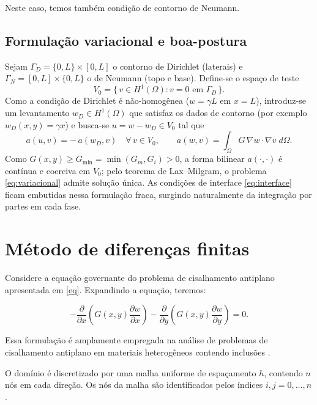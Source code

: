 \documentclass[brazil]{TCAM} %
\begin{document}
Neste caso, temos também condição de contorno de Neumann.

\subsection{Formulação variacional e boa-postura}

Sejam $\Gamma_D = \{0,L\}\times[0,L]$ o contorno de Dirichlet (laterais) e
$\Gamma_N = [0,L]\times\{0,L\}$ o de Neumann (topo e base). Define-se o espaço de
teste
\begin{equation*}
    V_0 = \{\, v \in H^1(\Omega) : v = 0 \text{ em } \Gamma_D \,\}.
\end{equation*}
Como a condição de Dirichlet é não-homogênea ($w = \gamma L$ em $x=L$), introduz-se
um levantamento $w_D \in H^1(\Omega)$ que satisfaz os dados de contorno (por exemplo
$w_D(x,y)=\gamma x$) e busca-se $u = w - w_D \in V_0$ tal que
\begin{equation}
    a(u,v) = -\,a(w_D,v) \quad \forall\, v \in V_0,
    \qquad
    a(w,v) = \int_{\Omega} G\,\nabla w \cdot \nabla v \; d\Omega .
    \label{eq:variacional}
\end{equation}
Como $G(x,y) \ge G_{\min} = \min(G_m,G_i) > 0$, a forma bilinear $a(\cdot,\cdot)$ é
contínua e coerciva em $V_0$; pelo teorema de Lax--Milgram, o problema
\eqref{eq:variacional} admite solução única. As condições de interface
\eqref{eq:interface} ficam embutidas nessa formulação fraca, surgindo naturalmente
da integração por partes em cada fase.
\section{Método de diferenças finitas}

Considere a equação governante do problema de cisalhamento antiplano apresentada em \eqref{eq}.
Expandindo a equação, teremos:

\begin{equation*}
- \frac{\partial}{\partial x}
\left(
G(x,y) \frac{\partial w}{\partial x}
\right)
-
\frac{\partial}{\partial y}
\left(
G(x,y) \frac{\partial w}{\partial y}
\right)
=0.
\end{equation*}

Essa formulação é amplamente empregada na análise de problemas de cisalhamento antiplano em materiais heterogêneos contendo inclusões \cite{lin2021simulation}.

O domínio é discretizado por uma malha uniforme de espaçamento $h$,
contendo $n$ nós em cada direção. Os nós da malha são identificados
pelos índices $i,j=0,\ldots,n$.
\end{document}
